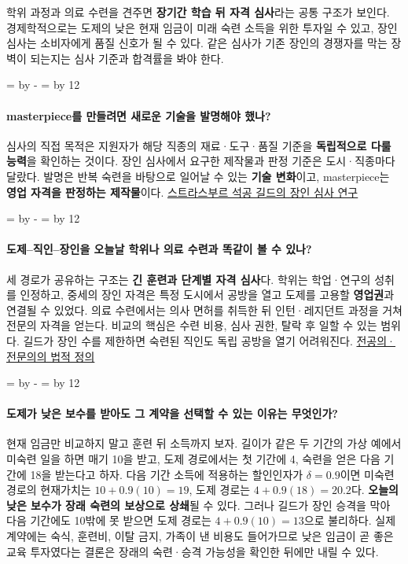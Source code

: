 \documentclass[10pt,a4paper]{article}
\newcommand{\ReserveQuestionSpace}{%
  \par\begingroup
  \dimen0=\pagegoal \advance\dimen0 by -\pagetotal
  \dimen2=\baselineskip \multiply\dimen2 by 12
  \ifdim\dimen0<\dimen2 \newpage\fi
  \endgroup}
\begin{document}
학위 과정과 의료 수련을 견주면 \textbf{장기간 학습 뒤 자격 심사}라는 공통 구조가 보인다. 경제학적으로는 도제의 낮은 현재 임금이 미래 숙련 소득을 위한 투자일 수 있고, 장인 심사는 소비자에게 품질 신호가 될 수 있다. 같은 심사가 기존 장인의 경쟁자를 막는 장벽이 되는지는 심사 기준과 합격률을 봐야 한다.\par

\ReserveQuestionSpace
\paragraph{masterpiece를 만들려면 새로운 기술을 발명해야 했나?}

심사의 직접 목적은 지원자가 해당 직종의 재료·도구·품질 기준을 \textbf{독립적으로 다룰 능력}을 확인하는 것이다. 장인 심사에서 요구한 제작물과 판정 기준은 도시·직종마다 달랐다. 발명은 반복 숙련을 바탕으로 일어날 수 있는 \textbf{기술 변화}이고, masterpiece는 \textbf{영업 자격을 판정하는 제작물}이다. \href{https://classiques-garnier.com/index.php/aedificare-2025-1-revue-internationale-d-histoire-de-la-construction-n-17-varia-examination-of-masterpieces-as-a-classification-procedure.html?displaymode=full}{스트라스부르 석공 길드의 장인 심사 연구}\par

\ReserveQuestionSpace
\paragraph{도제–직인–장인을 오늘날 학위나 의료 수련과 똑같이 볼 수 있나?}
세 경로가 공유하는 구조는 \textbf{긴 훈련과 단계별 자격 심사}다. 학위는 학업·연구의 성취를 인정하고, 중세의 장인 자격은 특정 도시에서 공방을 열고 도제를 고용할 \textbf{영업권}과 연결될 수 있었다. 의료 수련에서는 의사 면허를 취득한 뒤 인턴·레지던트 과정을 거쳐 전문의 자격을 얻는다. 비교의 핵심은 수련 비용, 심사 권한, 탈락 후 일할 수 있는 범위다. 길드가 장인 수를 제한하면 숙련된 직인도 독립 공방을 열기 어려워진다. \href{https://law.go.kr/LSW/lsLinkCommonInfo.do?lspttninfSeq=61760}{전공의·전문의의 법적 정의}\par

\ReserveQuestionSpace
\paragraph{도제가 낮은 보수를 받아도 그 계약을 선택할 수 있는 이유는 무엇인가?}

현재 임금만 비교하지 말고 훈련 뒤 소득까지 보자. 길이가 같은 두 기간의 가상 예에서 미숙련 일을 하면 매기 10을 받고, 도제 경로에서는 첫 기간에 4, 숙련을 얻은 다음 기간에 18을 받는다고 하자. 다음 기간 소득에 적용하는 할인인자가 $\delta=0.9$이면 미숙련 경로의 현재가치는 $10+0.9(10)=19$, 도제 경로는 $4+0.9(18)=20.2$다. \textbf{오늘의 낮은 보수가 장래 숙련의 보상으로 상쇄}될 수 있다. 그러나 길드가 장인 승격을 막아 다음 기간에도 10밖에 못 받으면 도제 경로는 $4+0.9(10)=13$으로 불리하다. 실제 계약에는 숙식, 훈련비, 이탈 금지, 가족이 낸 비용도 들어가므로 낮은 임금이 곧 좋은 교육 투자였다는 결론은 장래의 숙련·승격 가능성을 확인한 뒤에만 내릴 수 있다.\par
\end{document}
